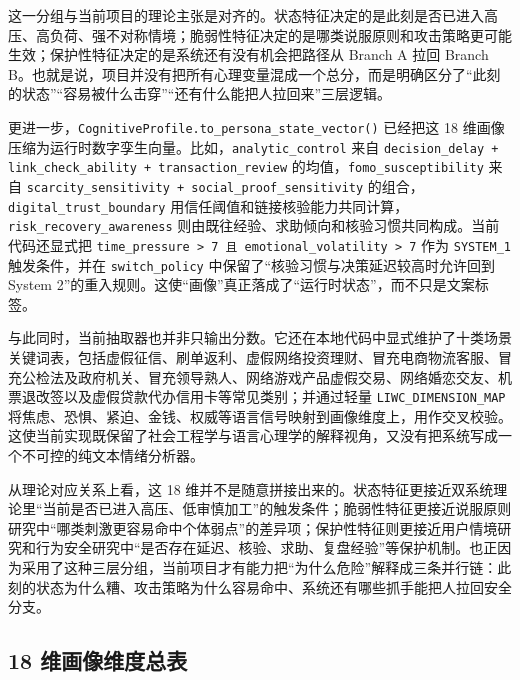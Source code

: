 \documentclass[12pt,a4paper]{ctexart}
\begin{document}
这一分组与当前项目的理论主张是对齐的。状态特征决定的是此刻是否已进入高压、高负荷、强不对称情境；脆弱性特征决定的是哪类说服原则和攻击策略更可能生效；保护性特征决定的是系统还有没有机会把路径从 Branch A 拉回 Branch B。也就是说，项目并没有把所有心理变量混成一个总分，而是明确区分了“此刻的状态”“容易被什么击穿”“还有什么能把人拉回来”三层逻辑。

更进一步，\texttt{CognitiveProfile.to\_persona\_state\_vector()} 已经把这 18 维画像压缩为运行时数字孪生向量。比如，\texttt{analytic\_control} 来自 \texttt{decision\_delay + link\_check\_ability + transaction\_review} 的均值，\texttt{fomo\_susceptibility} 来自 \texttt{scarcity\_sensitivity + social\_proof\_sensitivity} 的组合，\texttt{digital\_trust\_boundary} 用信任阈值和链接核验能力共同计算，\texttt{risk\_recovery\_awareness} 则由既往经验、求助倾向和核验习惯共同构成。当前代码还显式把 \texttt{time\_pressure > 7 且 emotional\_volatility > 7} 作为 \texttt{SYSTEM\_1} 触发条件，并在 \texttt{switch\_policy} 中保留了“核验习惯与决策延迟较高时允许回到 System 2”的重入规则。这使“画像”真正落成了“运行时状态”，而不只是文案标签。

与此同时，当前抽取器也并非只输出分数。它还在本地代码中显式维护了十类场景关键词表，包括虚假征信、刷单返利、虚假网络投资理财、冒充电商物流客服、冒充公检法及政府机关、冒充领导熟人、网络游戏产品虚假交易、网络婚恋交友、机票退改签以及虚假贷款代办信用卡等常见类别；并通过轻量 \texttt{LIWC\_DIMENSION\_MAP} 将焦虑、恐惧、紧迫、金钱、权威等语言信号映射到画像维度上，用作交叉校验。这使当前实现既保留了社会工程学与语言心理学的解释视角，又没有把系统写成一个不可控的纯文本情绪分析器。

从理论对应关系上看，这 18 维并不是随意拼接出来的。状态特征更接近双系统理论里“当前是否已进入高压、低审慎加工”的触发条件；脆弱性特征更接近说服原则研究中“哪类刺激更容易命中个体弱点”的差异项；保护性特征则更接近用户情境研究和行为安全研究中“是否存在延迟、核验、求助、复盘经验”等保护机制。也正因为采用了这种三层分组，当前项目才有能力把“为什么危险”解释成三条并行链：此刻的状态为什么糟、攻击策略为什么容易命中、系统还有哪些抓手能把人拉回安全分支。

\subsection{18 维画像维度总表}
\end{document}

